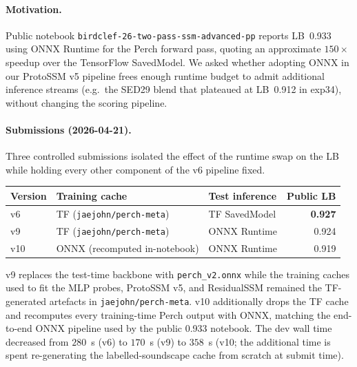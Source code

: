 \paragraph{Motivation.}
Public notebook
\texttt{birdclef-26-two-pass-ssm-advanced-pp} reports LB~0.933 using
ONNX Runtime for the Perch forward pass, quoting an approximate
$150\times$ speedup over the TensorFlow SavedModel. We asked
whether adopting ONNX in our ProtoSSM v5 pipeline frees enough
runtime budget to admit additional inference streams (e.g.\ the
SED29 blend that plateaued at LB~0.912 in exp34), without changing
the scoring pipeline.

\paragraph{Submissions (2026-04-21).}
Three controlled submissions isolated the effect of the runtime
swap on the LB while holding every other component of the v6
pipeline fixed.

\begin{center}
\begin{tabular}{lllr}
\toprule
Version & Training cache & Test inference & Public LB \\
\midrule
v6  & TF (\texttt{jaejohn/perch-meta}) & TF SavedModel & \textbf{0.927} \\
v9  & TF (\texttt{jaejohn/perch-meta}) & ONNX Runtime  & 0.924 \\
v10 & ONNX (recomputed in-notebook)    & ONNX Runtime  & 0.919 \\
\bottomrule
\end{tabular}
\end{center}

v9 replaces the test-time backbone with \texttt{perch\_v2.onnx} while
the training caches used to fit the MLP probes, ProtoSSM v5, and
ResidualSSM remained the TF-generated artefacts in
\texttt{jaejohn/perch-meta}. v10 additionally drops the TF cache and
recomputes every training-time Perch output with ONNX, matching the
end-to-end ONNX pipeline used by the public 0.933 notebook. The dev
wall time decreased from $280$~s (v6) to $170$~s (v9) to $358$~s (v10;
the additional time is spent re-generating the labelled-soundscape
cache from scratch at submit time).

